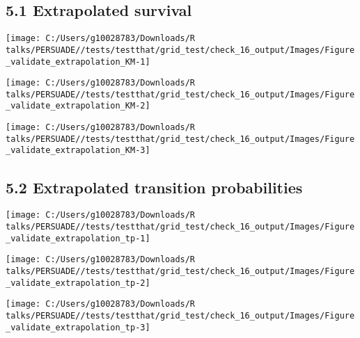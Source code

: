 \documentclass[
]{article}
\begin{document}
\subsection{5.1 Extrapolated survival}\label{extrapolated-survival}

\begin{flushleft}\texttt{[image: C:/Users/g10028783/Downloads/R talks/PERSUADE//tests/testthat/grid\_test/check\_16\_output/Images/Figure\_validate\_extrapolation\_KM-1]} \end{flushleft}

\begin{flushleft}\texttt{[image: C:/Users/g10028783/Downloads/R talks/PERSUADE//tests/testthat/grid\_test/check\_16\_output/Images/Figure\_validate\_extrapolation\_KM-2]} \end{flushleft}

\begin{flushleft}\texttt{[image: C:/Users/g10028783/Downloads/R talks/PERSUADE//tests/testthat/grid\_test/check\_16\_output/Images/Figure\_validate\_extrapolation\_KM-3]} \end{flushleft}

\clearpage

\subsection{5.2 Extrapolated transition
probabilities}\label{extrapolated-transition-probabilities}

\begin{flushleft}\texttt{[image: C:/Users/g10028783/Downloads/R talks/PERSUADE//tests/testthat/grid\_test/check\_16\_output/Images/Figure\_validate\_extrapolation\_tp-1]} \end{flushleft}

\begin{flushleft}\texttt{[image: C:/Users/g10028783/Downloads/R talks/PERSUADE//tests/testthat/grid\_test/check\_16\_output/Images/Figure\_validate\_extrapolation\_tp-2]} \end{flushleft}

\begin{flushleft}\texttt{[image: C:/Users/g10028783/Downloads/R talks/PERSUADE//tests/testthat/grid\_test/check\_16\_output/Images/Figure\_validate\_extrapolation\_tp-3]} \end{flushleft}

\clearpage
\end{document}
